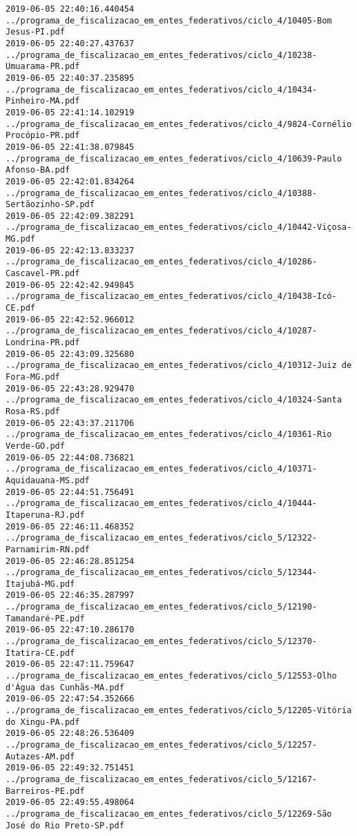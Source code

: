 \begin{lstlisting}
2019-06-05 22:40:16.440454 ../programa_de_fiscalizacao_em_entes_federativos/ciclo_4/10405-Bom Jesus-PI.pdf
2019-06-05 22:40:27.437637 ../programa_de_fiscalizacao_em_entes_federativos/ciclo_4/10238-Umuarama-PR.pdf
2019-06-05 22:40:37.235895 ../programa_de_fiscalizacao_em_entes_federativos/ciclo_4/10434-Pinheiro-MA.pdf
2019-06-05 22:41:14.102919 ../programa_de_fiscalizacao_em_entes_federativos/ciclo_4/9824-Cornélio Procópio-PR.pdf
2019-06-05 22:41:38.079845 ../programa_de_fiscalizacao_em_entes_federativos/ciclo_4/10639-Paulo Afonso-BA.pdf
2019-06-05 22:42:01.834264 ../programa_de_fiscalizacao_em_entes_federativos/ciclo_4/10388-Sertãozinho-SP.pdf
2019-06-05 22:42:09.382291 ../programa_de_fiscalizacao_em_entes_federativos/ciclo_4/10442-Viçosa-MG.pdf
2019-06-05 22:42:13.833237 ../programa_de_fiscalizacao_em_entes_federativos/ciclo_4/10286-Cascavel-PR.pdf
2019-06-05 22:42:42.949845 ../programa_de_fiscalizacao_em_entes_federativos/ciclo_4/10438-Icó-CE.pdf
2019-06-05 22:42:52.966012 ../programa_de_fiscalizacao_em_entes_federativos/ciclo_4/10287-Londrina-PR.pdf
2019-06-05 22:43:09.325680 ../programa_de_fiscalizacao_em_entes_federativos/ciclo_4/10312-Juiz de Fora-MG.pdf
2019-06-05 22:43:28.929470 ../programa_de_fiscalizacao_em_entes_federativos/ciclo_4/10324-Santa Rosa-RS.pdf
2019-06-05 22:43:37.211706 ../programa_de_fiscalizacao_em_entes_federativos/ciclo_4/10361-Rio Verde-GO.pdf
2019-06-05 22:44:08.736821 ../programa_de_fiscalizacao_em_entes_federativos/ciclo_4/10371-Aquidauana-MS.pdf
2019-06-05 22:44:51.756491 ../programa_de_fiscalizacao_em_entes_federativos/ciclo_4/10444-Itaperuna-RJ.pdf
2019-06-05 22:46:11.468352 ../programa_de_fiscalizacao_em_entes_federativos/ciclo_5/12322-Parnamirim-RN.pdf
2019-06-05 22:46:28.851254 ../programa_de_fiscalizacao_em_entes_federativos/ciclo_5/12344-Itajubá-MG.pdf
2019-06-05 22:46:35.287997 ../programa_de_fiscalizacao_em_entes_federativos/ciclo_5/12190-Tamandaré-PE.pdf
2019-06-05 22:47:10.286170 ../programa_de_fiscalizacao_em_entes_federativos/ciclo_5/12370-Itatira-CE.pdf
2019-06-05 22:47:11.759647 ../programa_de_fiscalizacao_em_entes_federativos/ciclo_5/12553-Olho d'Água das Cunhãs-MA.pdf
2019-06-05 22:47:54.352666 ../programa_de_fiscalizacao_em_entes_federativos/ciclo_5/12205-Vitória do Xingu-PA.pdf
2019-06-05 22:48:26.536409 ../programa_de_fiscalizacao_em_entes_federativos/ciclo_5/12257-Autazes-AM.pdf
2019-06-05 22:49:32.751451 ../programa_de_fiscalizacao_em_entes_federativos/ciclo_5/12167-Barreiros-PE.pdf
2019-06-05 22:49:55.498064 ../programa_de_fiscalizacao_em_entes_federativos/ciclo_5/12269-São José do Rio Preto-SP.pdf

\end{lstlisting}
